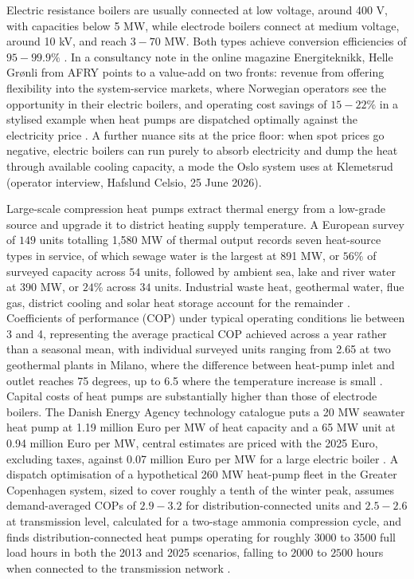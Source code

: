 Electric resistance boilers are usually connected at low voltage, around 400 V, with capacities below 5 MW, while electrode boilers connect at medium voltage, around 10 kV, and reach $3 - 70$ MW. Both types achieve conversion efficiencies of $95 - 99.9\%$ \cite{maruf_classification_2022}. In a consultancy note in the online magazine Energiteknikk, Helle Grønli from AFRY points to a value-add on two fronts: revenue from offering flexibility into the system-service markets, where Norwegian operators see the opportunity in their electric boilers, and operating cost savings of $15 - 22\%$ in a stylised example when heat pumps are dispatched optimally against the electricity price \cite{gronli_hvor_2025}. A further nuance sits at the price floor: when spot prices go negative, electric boilers can run purely to absorb electricity and dump the heat through available cooling capacity, a mode the Oslo system uses at Klemetsrud (operator interview, Hafslund Celsio, 25 June 2026). 

Large-scale compression heat pumps extract thermal energy from a low-grade source and upgrade it to district heating supply temperature. A European survey of $149$ units totalling 1,580 MW of thermal output records seven heat-source types in service, of which sewage water is the largest at 891 MW, or $56\%$ of surveyed capacity across $54$ units, followed by ambient sea, lake and river water at 390 MW, or $24\%$ across $34$ units. Industrial waste heat, geothermal water, flue gas, district cooling and solar heat storage account for the remainder \cite{david_heat_2017}. Coefficients of performance (COP) under typical operating conditions lie between 3 and 4, representing the average practical COP achieved across a year rather than a seasonal mean, with individual surveyed units ranging from 2.65 at two geothermal plants in Milano, where the difference between heat-pump inlet and outlet reaches 75 degrees, up to 6.5 where the temperature increase is small \cite{david_heat_2017}. Capital costs of heat pumps are substantially higher than those of electrode boilers. The Danish Energy Agency technology catalogue puts a 20 MW seawater heat pump at 1.19 million Euro per MW of heat capacity and a 65 MW unit at 0.94 million Euro per MW, central estimates are priced with the 2025 Euro, excluding taxes, against 0.07 million Euro per MW for a large electric boiler \cite{danish_energy_agency_technology_2024}. A dispatch optimisation of a hypothetical 260 MW heat-pump fleet in the Greater Copenhagen system, sized to cover roughly a tenth of the winter peak, assumes demand-averaged COPs of $2.9-3.2$ for distribution-connected units and $2.5-2.6$ at transmission level, calculated for a two-stage ammonia compression cycle, and finds distribution-connected heat pumps operating for roughly $3000$ to $3500$ full load hours in both the 2013 and 2025 scenarios, falling to $2000$ to $2500$ hours when connected to the transmission network \cite{bach_integration_2016}.

